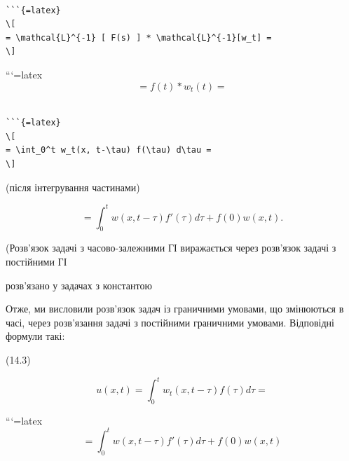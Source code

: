 \documentclass[
]{article}
\begin{document}
\begin{verbatim}

```{=latex}
\[
= \mathcal{L}^{-1} [ F(s) ] * \mathcal{L}^{-1}[w_t] =
\]
\end{verbatim}

```{=latex}
\[
= f(t) * w_t(t) =
\]

\begin{verbatim}

```{=latex}
\[
= \int_0^t w_t(x, t-\tau) f(\tau) d\tau =
\]
\end{verbatim}

(після інтегрування частинами)

\[
= \int_{0}^{t} w(x, t-\tau) f'(\tau) d\tau + f(0) w(x, t).
\]

(Розв'язок задачі з часово-залежними ГІ виражається через розв'язок
задачі з постійними ГІ

розв'язано у задачах з константою

Отже, ми висловили розв'язок задач із граничними умовами, що змінюються
в часі, через розв'язання задачі з постійними граничними умовами.
Відповідні формули такі:

(14.3)

\[
u(x, t) = \int_{0}^{t} w_{t}(x, t - \tau) f(\tau) d\tau =
\]

```{=latex}
\[
= \int_{0}^{t} w(x, t - \tau) f'(\tau) d\tau + f(0) w(x, t)
\]
\end{document}
